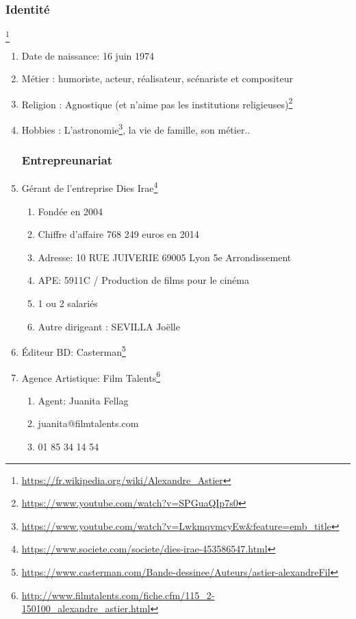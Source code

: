 \subsubsection{Identité}\footnote{\url{https://fr.wikipedia.org/wiki/Alexandre_Astier}}
\begin{enumerate}
\item Date de naissance: 16 juin 1974
\item Métier : humoriste, acteur, réalisateur, scénariste et compositeur
\item Religion : Agnostique (et n’aime pas les institutions religieuses)\footnote{\url{https://www.youtube.com/watch?v=SPGuaQIp7s0}}
\item Hobbies : L’astronomie\footnote{\url{https://www.youtube.com/watch?v=LwkmqvmcyEw&feature=emb_title}}, la vie de famille, son métier..
\subsubsection{Entrepreunariat}
\item Gérant de l’entreprise Dies Irae\footnote{\url{https://www.societe.com/societe/dies-irae-453586547.html}}
\begin{enumerate}
\item Fondée en 2004
\item Chiffre d’affaire 768 249 euros en 2014
\item Adresse: 10 RUE JUIVERIE 69005 Lyon 5e Arrondissement
\item APE: 5911C / Production de films pour le cinéma
\item 1 ou 2 salariés
\item Autre dirigeant : SEVILLA Joëlle
\end{enumerate}
\item Éditeur BD: Casterman\footnote{\url{https://www.casterman.com/Bande-dessinee/Auteurs/astier-alexandreFil}}
\item Agence Artistique: Film Talents\footnote{\url{http://www.filmtalents.com/fiche.cfm/115_2-150100_alexandre_astier.html}}
\begin{enumerate}
\item Agent: Juanita Fellag
\item juanita@filmtalents.com
\item 01 85 34 14 54
\end{enumerate}


\end{enumerate}
